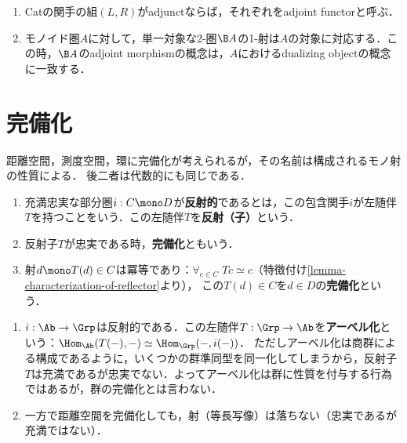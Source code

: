 \documentclass[uplatex,dvipdfmx]{jsreport}
\begin{document}
\begin{example}[adjunction]\mbox{}
    \begin{enumerate}
        \item Catの関手の組$(L,R)$がadjunctならば，それぞれをadjoint functorと呼ぶ．
        \item モノイド圏$A$に対して，単一対象な2-圏$\B A$の1-射は$A$の対象に対応する．この時，$\B A$のadjoint morphismの概念は，$A$におけるdualizing objectの概念に一致する．
    \end{enumerate}
\end{example}

\section{完備化}

\begin{tcolorbox}[colframe=ForestGreen, colback=ForestGreen!10!white,breakable,colbacktitle=ForestGreen!40!white,coltitle=black,fonttitle=\bfseries\sffamily,
title=]
    距離空間，測度空間，環に完備化が考えられるが，その名前は構成されるモノ射の性質による．
    後二者は代数的にも同じである．
\end{tcolorbox}

\begin{definition}\mbox{}
    \begin{enumerate}
        \item 充満忠実な部分圏$i:C\mono D$が\textbf{反射的}であるとは，この包含関手$i$が左随伴$T$を持つことをいう．この左随伴$T$を\textbf{反射（子）}という．
        \item 反射子$T$が忠実である時，\textbf{完備化}ともいう．
        \item 射$d\mono T(d)\in C$は冪等であり：$\forall_{c\in C}\;Tc\simeq c$（特徴付け\ref{lemma-characterization-of-reflector}より），
        この$T(d)\in C$を$d\in D$の\textbf{完備化}という．
    \end{enumerate}
\end{definition}
\begin{example}\mbox{}
    \begin{enumerate}
        \item $i:\Ab\to\Grp$は反射的である．この左随伴$T:\Grp\to\Ab$を\textbf{アーベル化}という：$\Hom_\Ab(T(-),-)\simeq\Hom_\Grp(-,i(-))$．
        ただしアーベル化は商群による構成であるように，いくつかの群準同型を同一化してしまうから，反射子$T$は充満であるが忠実でない．よってアーベル化は群に性質を付与する行為ではあるが，群の完備化とは言わない．
        \item 一方で距離空間を完備化しても，射（等長写像）は落ちない（忠実であるが充満ではない）．
    \end{enumerate}
\end{example}
\end{document}
